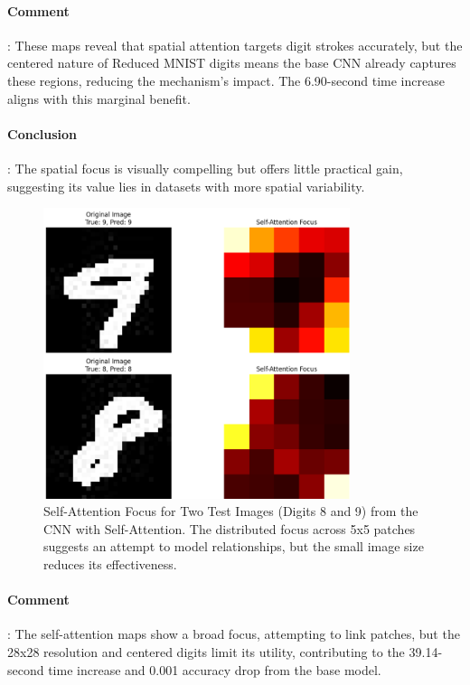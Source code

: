 \documentclass[12pt]{article}
\begin{document}
\paragraph{Comment}: These maps reveal that spatial attention targets digit strokes accurately, but the centered nature of Reduced MNIST digits means the base CNN already captures these regions, reducing the mechanism's impact. The 6.90-second time increase aligns with this marginal benefit.
\paragraph{Conclusion}: The spatial focus is visually compelling but offers little practical gain, suggesting its value lies in datasets with more spatial variability.
\begin{figure}[H]
    \centering
    \includegraphics[width=0.8\textwidth]{self_attention_maps.png}
    \caption{Self-Attention Focus for Two Test Images (Digits 8 and 9) from the CNN with Self-Attention. The distributed focus across 5x5 patches suggests an attempt to model relationships, but the small image size reduces its effectiveness.}
    \label{fig:self_attention_maps}

\end{figure}
    \paragraph{Comment}: The self-attention maps show a broad focus, attempting to link patches, but the 28x28 resolution and centered digits limit its utility, contributing to the 39.14-second time increase and 0.001 accuracy drop from the base model.
\end{document}
